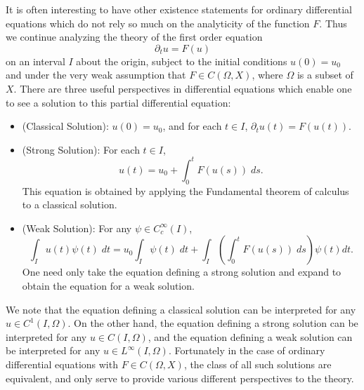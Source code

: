 It is often interesting to have other existence statements for ordinary differential equations which do not rely so much on the analyticity of the function $F$. Thus we continue analyzing the theory of the first order equation
%
\[ \partial_t u = F(u) \]
%
on an interval $I$ about the origin, subject to the initial conditions $u(0) = u_0$ and under the very weak assumption that $F \in C(\Omega,X)$, where $\Omega$ is a subset of $X$. There are three useful perspectives in differential equations which enable one to see a solution to this partial differential equation:
%
\begin{itemize}
    \item (Classical Solution): $u(0) = u_0$, and for each $t \in I$, $\partial_t u(t) = F(u(t))$.
    \item (Strong Solution): For each $t \in I$,
    \[ u(t) = u_0 + \int_0^t F(u(s))\; ds. \]
    This equation is obtained by applying the Fundamental theorem of calculus to a classical solution.

    \item (Weak Solution): For any $\psi \in C_c^\infty(I)$,
    \[ \int_I u(t) \psi(t)\; dt = u_0 \int_I \psi(t)\; dt + \int_I \left( \int_0^t F(u(s))\; ds \right) \psi(t) dt. \]
    One need only take the equation defining a strong solution and expand to obtain the equation for a weak solution.
\end{itemize}
%
We note that the equation defining a classical solution can be interpreted for any $u \in C^1(I,\Omega)$. On the other hand, the equation defining a strong solution can be interpreted for any $u \in C(I,\Omega)$, and the equation defining a weak solution can be interpreted for any $u \in L^\infty(I,\Omega)$. Fortunately in the case of ordinary differential equations with $F \in C(\Omega,X)$, the class of all such solutions are equivalent, and only serve to provide various different perspectives to the theory.

